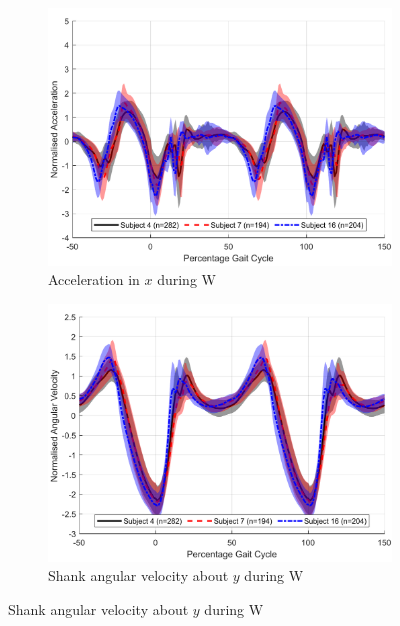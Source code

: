 \begin{figure}[!hbtp]
     \centering
     \begin{subfigure}[H]{0.45\textwidth}
    \centering
         \includegraphics[width=\textwidth]{content/4-LSTM_Behaviour/inter_subject_trends/accel_x_trend_Walking.pdf}
         \caption{Acceleration in $x$ during W}
         \label{subfig:x_accel_w}
     \end{subfigure}
     \begin{subfigure}[H]{0.45\textwidth}
    \centering
         \includegraphics[width=\textwidth]{content/4-LSTM_Behaviour/inter_subject_trends/gyro_y_trend_Walking.pdf}
         \caption{Shank angular velocity about $y$ during W}
         \label{subfig:y_gyro_w}

\end{subfigure}
\end{figure}
